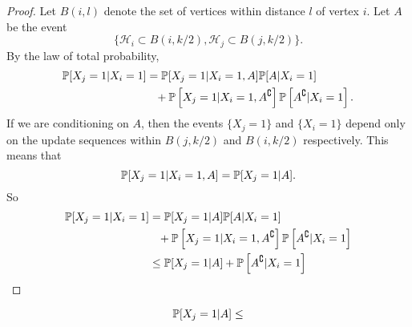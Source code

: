 \begin{proof}
	Let $B(i, l)$ denote the set of vertices within distance $l$ of vertex $i$. Let $A$ be the event
	\begin{equation}
		\{\mathcal{H}_i \subset B(i,k/2), \mathcal{H}_j \subset B(j, k/2)\}.
	\end{equation}
	By the law of total probability,
	\begin{align}
		\mathbb{P}[X_j = 1 | X_i = 1] &= \mathbb{P}[X_j = 1 | X_i = 1, A] \mathbb{P}[A|X_i = 1] \notag \\ 
		&\phantom{=}  +\mathbb{P}\left[X_j = 1 | X_i = 1, A^\complement\right] \mathbb{P}\left[A^\complement|X_i = 1\right].
	\end{align}
	If we are conditioning on $A$, then the events $\{X_j = 1\}$ and $\{X_i = 1\}$ depend only on the update sequences within $B(j, k/2)$ and $B(i, k/2)$ respectively. This means that
	\begin{equation}
		\mathbb{P}[X_j = 1 | X_i = 1, A] = \mathbb{P}[X_j = 1 | A].
	\end{equation}
	So
	\begin{align}
		\mathbb{P}[X_j = 1 | X_i = 1] &= \mathbb{P}[X_j = 1 | A] \mathbb{P}[A|X_i = 1] \notag \\ 
		&\phantom{=}  +\mathbb{P}\left[X_j = 1 | X_i = 1, A^\complement\right] \mathbb{P}\left[A^\complement|X_i = 1\right]\\
		&\leq \mathbb{P}[X_j = 1 | A] + \mathbb{P}\left[A^\complement | X_i = 1\right]
	\end{align}
\end{proof}
\begin{lemma}
	\begin{equation}
		\mathbb{P}[X_j = 1 | A] \leq 
	\end{equation}
\end{lemma}
